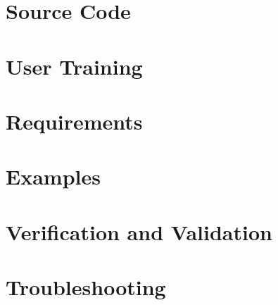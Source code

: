 \documentclass{simcenterdocumentation}
\begin{document}
\chapter{Source Code}
\label{chap:SourceCode}


\chapter{User Training}
\label{chap:training}


\chapter{Requirements}
\label{chap:requirements}


\chapter{Examples}
\label{chap:examples}


\chapter{Verification and Validation}
\label{chap:vnv}


\chapter{Troubleshooting}
\label{chap:troubleshooting}


\nocite{*}


\pagestyle{plain}
{
  \renewcommand{\thispagestyle}[1]{}	
  \printbibliography           
}
\end{document}
